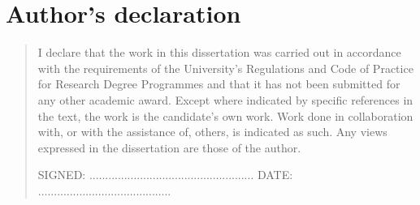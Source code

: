 %
%
\chapter{Author's declaration}
\begin{SingleSpace}
\begin{quote}
I declare that the work in this dissertation was carried out in accordance with the requirements of  the University's Regulations and Code of Practice for Research Degree Programmes and that it  has not been submitted for any other academic award. Except where indicated by specific references in the text, the work is the candidate's own work. Work done in collaboration with, or with the assistance of, others, is indicated as such. Any views expressed in the dissertation are those of the author.

\vspace{1.5cm}
\noindent
\hspace{-0.75cm}\textsc{SIGNED: .................................................... DATE: ..........................................}
\end{quote}
\end{SingleSpace}
\clearpage